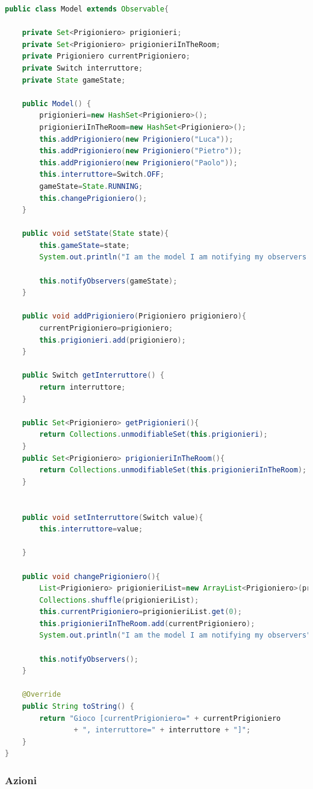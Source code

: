 \documentclass{article}
\begin{document}
\begin{lstlisting}[language=Java]
public class Model extends Observable{

	private Set<Prigioniero> prigionieri;
	private Set<Prigioniero> prigionieriInTheRoom;
	private Prigioniero currentPrigioniero;
	private Switch interruttore;
	private State gameState;
	
	public Model() {
		prigionieri=new HashSet<Prigioniero>();
		prigionieriInTheRoom=new HashSet<Prigioniero>();
		this.addPrigioniero(new Prigioniero("Luca"));
		this.addPrigioniero(new Prigioniero("Pietro"));
		this.addPrigioniero(new Prigioniero("Paolo"));
		this.interruttore=Switch.OFF;
		gameState=State.RUNNING;
		this.changePrigioniero();
	}
	
	public void setState(State state){
		this.gameState=state;
		System.out.println("I am the model I am notifying my observers with a new game state");
		
		this.notifyObservers(gameState);
	}
	
	public void addPrigioniero(Prigioniero prigioniero){
		currentPrigioniero=prigioniero;
		this.prigionieri.add(prigioniero);
	}

	public Switch getInterruttore() {
		return interruttore;
	}
	
	public Set<Prigioniero> getPrigionieri(){
		return Collections.unmodifiableSet(this.prigionieri);
	}
	public Set<Prigioniero> prigionieriInTheRoom(){
		return Collections.unmodifiableSet(this.prigionieriInTheRoom);
	}
	
	
	public void setInterruttore(Switch value){
		this.interruttore=value;

	}
	
	public void changePrigioniero(){
		List<Prigioniero> prigionieriList=new ArrayList<Prigioniero>(prigionieri);
		Collections.shuffle(prigionieriList);
		this.currentPrigioniero=prigionieriList.get(0);
		this.prigionieriInTheRoom.add(currentPrigioniero);
		System.out.println("I am the model I am notifying my observers");
		
		this.notifyObservers();
	}
	
	@Override
	public String toString() {
		return "Gioco [currentPrigioniero=" + currentPrigioniero
				+ ", interruttore=" + interruttore + "]";
	}
}
\end{lstlisting}

\subsubsection{Azioni}
\end{document}
